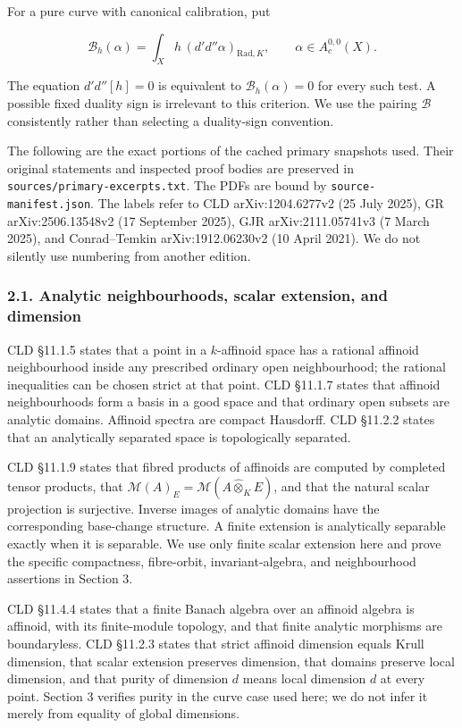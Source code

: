 \documentclass[
  11pt,
]{article}
\begin{document}
For a pure curve with canonical calibration, put

\[
\mathcal B_h(\alpha)=\int_X h\,(d'd''\alpha)_{\mathrm{Rad},K},\qquad \alpha\in A_c^{0,0}(X).
\]

The equation \(d'd''[h]=0\) is equivalent to \(\mathcal B_h(\alpha)=0\)
for every such test. A possible fixed duality sign is irrelevant to this
criterion. We use the pairing \(\mathcal B\) consistently rather than
selecting a duality-sign convention.

The following are the exact portions of the cached primary snapshots
used. Their original statements and inspected proof bodies are preserved
in \texttt{sources/primary-excerpts.txt}. The PDFs are bound by
\texttt{source-manifest.json}. The labels refer to CLD arXiv:1204.6277v2
(25 July 2025), GR arXiv:2506.13548v2 (17 September 2025), GJR
arXiv:2111.05741v3 (7 March 2025), and Conrad--Temkin arXiv:1912.06230v2
(10 April 2021). We do not silently use numbering from another edition.

\subsubsection{2.1. Analytic neighbourhoods, scalar extension, and
dimension}\label{analytic-neighbourhoods-scalar-extension-and-dimension}

CLD §11.1.5 states that a point in a \(k\)-affinoid space has a rational
affinoid neighbourhood inside any prescribed ordinary open
neighbourhood; the rational inequalities can be chosen strict at that
point. CLD §11.1.7 states that affinoid neighbourhoods form a basis in a
good space and that ordinary open subsets are analytic domains. Affinoid
spectra are compact Hausdorff. CLD §11.2.2 states that an analytically
separated space is topologically separated.

CLD §11.1.9 states that fibred products of affinoids are computed by
completed tensor products, that
\(\mathcal M(A)_E=\mathcal M(A\widehat\otimes_K E)\), and that the
natural scalar projection is surjective. Inverse images of analytic
domains have the corresponding base-change structure. A finite extension
is analytically separable exactly when it is separable. We use only
finite scalar extension here and prove the specific compactness,
fibre-orbit, invariant-algebra, and neighbourhood assertions in Section
3.

CLD §11.4.4 states that a finite Banach algebra over an affinoid algebra
is affinoid, with its finite-module topology, and that finite analytic
morphisms are boundaryless. CLD §11.2.3 states that strict affinoid
dimension equals Krull dimension, that scalar extension preserves
dimension, that domains preserve local dimension, and that purity of
dimension \(d\) means local dimension \(d\) at every point. Section 3
verifies purity in the curve case used here; we do not infer it merely
from equality of global dimensions.
\end{document}

